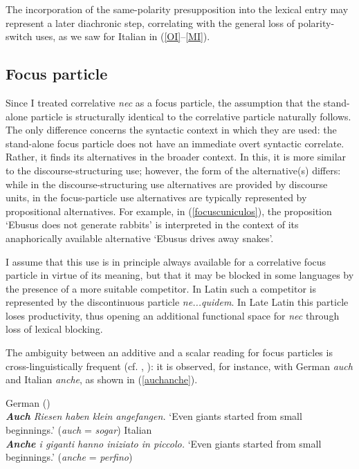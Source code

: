\documentclass[output=paper]{langsci/langscibook}
\begin{document}
The incorporation of the same-polarity presupposition into the lexical entry may represent a later diachronic step, correlating with the general loss of po\-lar\-ity-switch uses, as we saw for Italian in (\ref{OI}--\ref{MI}).

\subsection{Focus particle}

Since I treated correlative {\emph{nec}} as a focus particle, the assumption that the stand-alone particle is structurally identical to the correlative particle naturally follows. The only difference concerns the syntactic context in which they are used: the stand-alone focus particle does not have an immediate overt syntactic correlate. Rather, it finds its alternatives in the broader context. In this, it is more similar to the discourse-structuring use; however, the form of the alternative(s) differs: while in the discourse-structuring use alternatives are provided by discourse units, in the focus-particle use alternatives are typically represented by propositional alternatives. For example, in (\ref{focuscuniculos}), the proposition `Ebusus does not generate rabbits' is interpreted in the context of its anaphorically available alternative `Ebusus drives away snakes'.

I assume that this use is in principle always available for a correlative focus particle in virtue of its meaning, but that it may be blocked in some languages by the presence of a more suitable competitor. In Latin such a competitor is represented by the discontinuous particle {\emph{ne...quidem}}. In Late Latin this particle loses productivity, thus opening an additional functional space for {\emph{nec}} through loss of lexical blocking.

The ambiguity between an additive and a scalar reading for focus particles is cross-linguistically frequent (cf. \citealt[158--159]{Koenig91}, \citealt[24--25]{GastAuwera11}): it is observed, for instance, with German {\emph{auch}} and Italian {\emph{anche}}, as shown in (\ref{auchanche}).

{\begin{exe}
\ex \label{auchanche}
\begin{xlist}
\ex German (\citealt[62]{Koenig91})\\
{\itshape\textbf{Auch} Riesen haben klein angefangen.}
\glt `Even giants started from small beginnings.' ({\emph{auch}} = {\emph{sogar}})
\ex Italian\\
{\itshape\textbf{Anche} i giganti hanno iniziato in piccolo.}
\glt `Even giants started from small beginnings.' ({\emph{anche}} = {\emph{perfino}})
\end{xlist}
\end{exe}}
\end{document}
